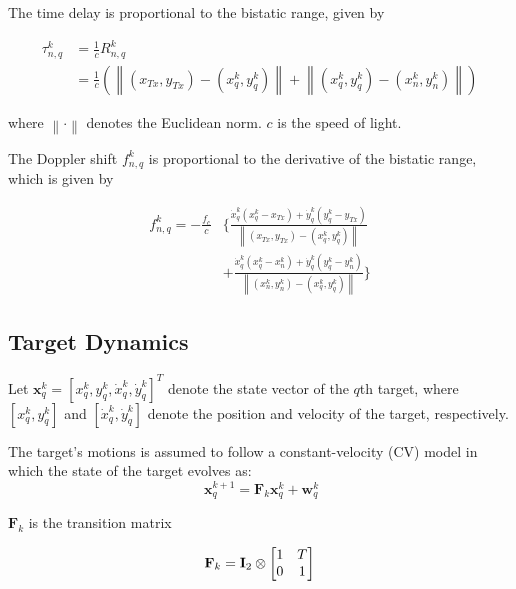 \documentclass[12pt,journal,draftclsnofoot,onecolumn]{IEEEtran}
\begin{document}
The time delay is proportional to the bistatic range, given by

\begin{equation}
\begin{aligned}
    \tau_{n,q}^k&=\frac{1}{c}R_{n,q}^k\\
    &=\frac{1}{c}(\left \|(x_{Tx},y_{Tx})-(x_q^k,y_q^k)\right \|+\left \|(x_q^k,y_q^k)-(x_n^k,y_n^k)\right \|)
\end{aligned}
\label{bistatic range}
\end{equation}

where $\left \|\cdot\right\|$ denotes the Euclidean norm. $c$ is the speed of light.

The Doppler shift $f_{n,q}^k$ is proportional to the derivative of the bistatic range, which is given by

\begin{equation} 
	\begin{aligned}
	f_{n,q}^k = - \frac{f_c}{c}& \bigg\{\frac{\dot{x}_q^k\left(x_q^k - x_{Tx} \right) +\dot{y}_q^k \left(y_q^k - y_{Tx} \right)}{\left \|(x_{Tx},y_{Tx})-(x_q^k,y_q^k)\right \|}\\
	&+\frac{\dot{x}_q^k\left(x_q^k - x_n^k \right) +\dot{y}_q^k \left(y_q^k - y_n^k \right)}{\left \|(x_n^k,y_n^k)-(x_q^k,y_q^k)\right \|}\bigg\}
	\end{aligned}
	\label{doppler shift}
\end{equation}


\subsection{Target Dynamics}
Let $\mathbf{x}_q^k={[x_q^k, y_q^k, \dot{x}_q^k, \dot{y}_q^k]^T}$ denote the state vector of the $q$th target, where $\left[ x_q^k, y_q^k \right]$ and $\left[ \dot{x}_q^k, \dot{y}_q^k \right]$ denote the position and velocity of the target, respectively.

The target's motions is assumed to follow a constant-velocity (CV) model in which the state of the target evolves as:
\begin{equation}\ \mathbf{x}_q^{k+1}=\mathbf{F}_k\mathbf{x}_q^k+\mathbf{w}_q^k\end{equation}

$\mathbf{F}_k$ is the transition matrix

\begin{equation}
    {\bf F}_k={\bf I}_{2}\otimes\left[\begin{matrix}1 & T \\ 0 & 1\end{matrix}\right]
\end{equation}
\end{document}
